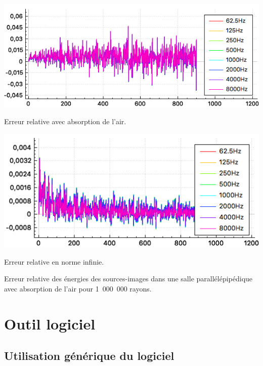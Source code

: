 \begin{figureth}
	\begin{subfigureth}{0.8\textwidth}
		\includegraphics[width=\linewidth]{images/test3_8}
		\caption{Erreur relative avec absorption de l'air.}
		\label{test3_8}
	\end{subfigureth}
	\begin{subfigureth}{0.8\textwidth}
		\includegraphics[width=\linewidth]{images/test3_9}
		\caption{Erreur relative en norme infinie.}
		\label{test3_9}
	\end{subfigureth}
	\caption{Erreur relative des énergies des sources-images dans une salle parallélépipédique avec absorption de l'air pour 1~000~000 rayons.}
\end{figureth}






\chapter{Outil logiciel}
	\minitoc
	\newpage
	

	
\section{Utilisation générique du logiciel}\label{sect_logiciel}
	
